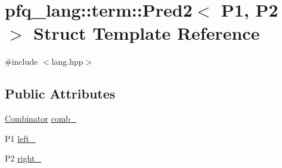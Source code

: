 \hypertarget{structpfq__lang_1_1term_1_1Pred2}{\section{pfq\-\_\-lang\-:\-:term\-:\-:Pred2$<$ P1, P2 $>$ Struct Template Reference}
\label{structpfq__lang_1_1term_1_1Pred2}
}


{\ttfamily \#include $<$lang.\-hpp$>$}

\subsection*{Public Attributes}
\begin{DoxyCompactItemize}
\item 
\hyperlink{structpfq__lang_1_1term_1_1Combinator}{Combinator} \hyperlink{structpfq__lang_1_1term_1_1Pred2_a6b0db7f4e7c69fef8112e5b9a65e2af9}{comb\-\_\-}
\item 
P1 \hyperlink{structpfq__lang_1_1term_1_1Pred2_accc6c58f733abc7027ffde56148dd91e}{left\-\_\-}
\item 
P2 \hyperlink{structpfq__lang_1_1term_1_1Pred2_a0bc158e2c177545dcc9199caab6a4d12}{right\-\_\-}
\end{DoxyCompactItemize}


